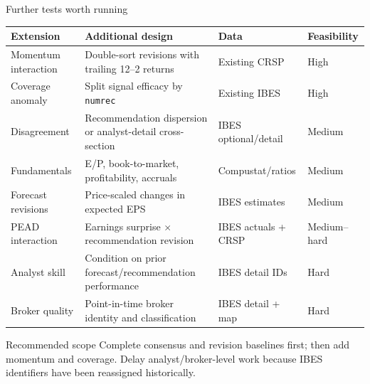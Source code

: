 \documentclass[aspectratio=169,10pt]{beamer}
\begin{document}
\begin{frame}[shrink=10]{Further tests worth running}
\scriptsize
\begin{tabular}{@{}L{2.65cm}L{5.45cm}L{2.55cm}L{1.55cm}@{}}
\toprule
\textbf{Extension} & \textbf{Additional design} & \textbf{Data} & \textbf{Feasibility} \\
\midrule
Momentum interaction & Double-sort revisions with trailing 12--2 returns & Existing CRSP & High \\
Coverage anomaly & Split signal efficacy by \texttt{numrec} & Existing IBES & High \\
Disagreement & Recommendation dispersion or analyst-detail cross-section & IBES optional/detail & Medium \\
Fundamentals & E/P, book-to-market, profitability, accruals & Compustat/ratios & Medium \\
Forecast revisions & Price-scaled changes in expected EPS & IBES estimates & Medium \\
PEAD interaction & Earnings surprise $\times$ recommendation revision & IBES actuals + CRSP & Medium--hard \\
Analyst skill & Condition on prior forecast/recommendation performance & IBES detail IDs & Hard \\
Broker quality & Point-in-time broker identity and classification & IBES detail + map & Hard \\
\bottomrule
\end{tabular}
\vspace{0.35cm}
\begin{alertblock}{Recommended scope}
Complete consensus and revision baselines first; then add momentum and coverage. Delay analyst/broker-level work because IBES identifiers have been reassigned historically.
\end{alertblock}
\end{frame}
\end{document}
